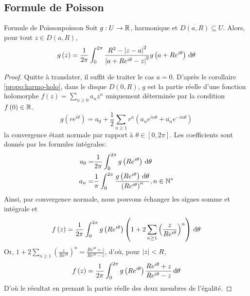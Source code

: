 \documentclass{cours}
\begin{document}
\subsection{Formule de Poisson}
\begin{propositionfr}
	{Formule de Poisson}{poisson}
	Soit $g : U \to \mathbb{R}$, harmonique et $\overline{D\left(a, R\right)} \subseteq U$. Alors, pour tout $z \in D\left(a, R\right)$, 
	\begin{equation*}
		g\left(z\right) = \frac{1}{2\pi}\int_{0}^{2\pi}\frac{R^{2} - \left|z - a\right|^{2}}{\left|a + Re^{i\theta} - z\right|^{2}}g\left(a + Re^{i\theta}\right){\rm \, d} \theta
	\end{equation*}
\end{propositionfr}
\begin{proof}
	Quitte à translater, il suffit de traiter le cas $a = 0$. D'après le corollaire \ref{propo:harmo-holo}, dans le disque $D\left(0, R\right)$, $g$ est la partie réelle d'une fonction holomorphe $f\left(z\right) = \sum_{n \geq 0} a_{n}z^{n}$ uniquement déterminée par la condition $f\left(0\right) \in \mathbb{R}$. 
	\begin{equation*}
		g\left(re^{i\theta}\right) = a_{0} + \frac{1}{2}\sum_{n \geq 1}r^{n}\left(a_{n}e^{in\theta} + \overline{a_{n}} e^{-in\theta}\right)
	\end{equation*}
	la convergence étant normale par rapport à $\theta \in \left[0, 2\pi\right]$. Les coefficients sont donnés par les formules intégrales: 
	\begin{equation*}
		\begin{aligned}
			a_{0} =& \frac{1}{2\pi}\int_{0}^{2\pi} g\left(Re^{i\theta}\right){\rm \, d} \theta\\
			a_{n} =& \frac{1}{\pi}\int_{0}^{2\pi} \frac{g\left(Re^{i\theta}\right){\rm \, d}\theta}{\left(Re^{i\theta}\right)^{n}}, n\in \mathbb{N}^{*}
		\end{aligned}
	\end{equation*}
	Ainsi, par convergence normale, nous pouvons échanger les signes somme et intégrale et 
	\begin{equation*}
		f\left(z\right) = \frac{1}{2\pi}\int_{0}^{2\pi}g\left(Re^{i\theta}\right) \left(1 + 2\sum_{n \geq 1}\left(\frac{z}{Re^{i\theta}}\right)^{n}\right){\rm \, d} \theta
	\end{equation*}
	Or, $1 + 2 \sum_{n \geq 1} \left(\frac{z}{Re^{i\theta}}\right)^{n} = \frac{Re^{i\theta} + z}{Re^{i\theta} - z}$, d'où, pour $\left|z\right| < R$, 
	\begin{equation*}
		f\left(z\right) = \frac{1}{2\pi}\int_{0}^{2\pi}g\left(Re^{i\theta}\right)\frac{Re^{i\theta} + z}{Re^{i\theta} - z}{\rm \, d} \theta
	\end{equation*}
	D'où le résultat en prenant la partie réelle des deux membres de l'égalité.
\end{proof}
\end{document}
